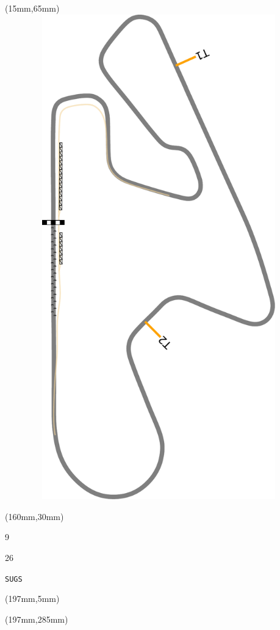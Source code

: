 \begin{textblock*}{185mm}(15mm,65mm)%
\centering
\mbox{\includegraphics[width=185mm,height=210mm,keepaspectratio]{PT/SUGS.pdf}}
\end{textblock*}
\begin{textblock*}{40mm}(160mm,30mm)%
\Large
\par{} 
\par9 
\par26 
\par\hfill\tiny\tt SUGS\\
\end{textblock*}
\begin{textblock*}{20mm}(197mm,5mm)%
\fbox{\thepage}
\label{SUGS}
\end{textblock*}
\begin{textblock*}{20mm}(197mm,285mm)%
\fbox{\thepage}
\end{textblock*}

